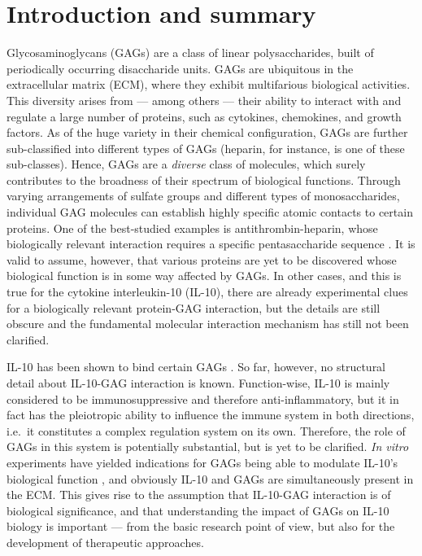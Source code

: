 \chapter{Introduction and summary}



Glycosaminoglycans (GAGs) are a class of linear polysaccharides, built of
periodically occurring disaccharide units. GAGs are ubiquitous in the
extracellular matrix (ECM), where they exhibit multifarious biological
activities. This diversity arises from --- among others --- their ability to
interact with and regulate a large number of proteins, such as cytokines,
chemokines, and growth factors. As of the huge variety in their chemical
configuration, GAGs are further sub-classified into different types of GAGs
(heparin, for instance, is one of these sub-classes). Hence, GAGs are a
\textit{diverse} class of molecules, which surely contributes to the broadness
of their spectrum of biological functions. Through varying arrangements of
sulfate groups and different types of monosaccharides, individual GAG molecules
can establish highly specific atomic contacts to certain proteins. One of the
best-studied examples is antithrombin-heparin, whose biologically relevant
interaction requires a specific pentasaccharide sequence
\cite{antithrombin-thrombin-heparin-2004}. It is valid to assume, however, that
various proteins are yet to be discovered whose biological function is in some
way affected by GAGs. In other cases, and this is true for the cytokine
interleukin-10 (IL-10), there are already experimental clues for a biologically
relevant protein-GAG interaction, but the details are still obscure and the
fundamental molecular interaction mechanism has still not been clarified.

IL-10 has been shown to bind certain GAGs \cite{salek_ardakani_2000}. So far,
however, no structural detail about IL-10-GAG interaction is known.
Function-wise, IL-10 is mainly considered to be immunosuppressive and therefore
anti-inflammatory, but it in fact has the pleiotropic ability to influence the
immune system in both directions, i.e.\ it constitutes a complex regulation
system on its own. Therefore, the role of GAGs in this system is potentially
substantial, but is yet to be clarified. \textit{In vitro} experiments have
yielded indications for GAGs being able to modulate IL-10's biological function
\cite{salek_ardakani_2000}, and obviously IL-10 and GAGs are simultaneously
present in the ECM. This gives rise to the assumption that IL-10-GAG interaction
is of biological significance, and that understanding the impact of GAGs on
IL-10 biology is important --- from the basic research point of view, but also
for the development of therapeutic approaches.

